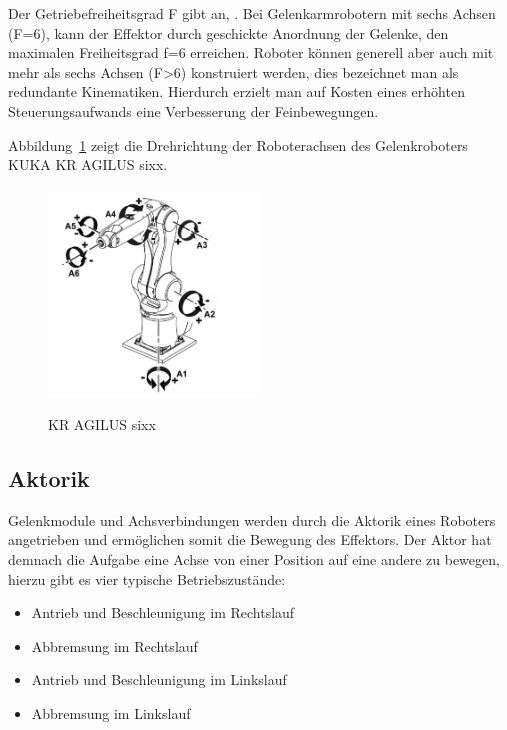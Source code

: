 \documentclass[11pt,ngerman,parskip=half]{scrartcl}
\begin{document}
Der Getriebefreiheitsgrad F gibt an,
. Bei Gelenkarmrobotern mit sechs Achsen (F=6), kann der
Effektor durch geschickte Anordnung der Gelenke, den maximalen Freiheitsgrad
f=6 erreichen. Roboter können generell aber auch mit mehr als sechs Achsen
(F>6) konstruiert werden, dies bezeichnet man als redundante Kinematiken.
Hierdurch erzielt man auf Kosten eines erhöhten Steuerungsaufwands eine
Verbesserung der Feinbewegungen.
\parencite[vgl.][18]{weber_industrieroboter:_2017}

Abbildung~\ref{img:KR-AGILUS-sixx} zeigt die Drehrichtung der Roboterachsen des
Gelenkroboters KUKA KR AGILUS sixx.
\begin{figure}[H]
  \centering
  \includegraphics[width=0.5\textwidth]{src/img/KR-AGILUS-sixx.png}
  \caption{KR AGILUS sixx}
  \label{img:KR-AGILUS-sixx}
  \parencite{kuka_gmbh_kr_2018}
\end{figure}

\subsection{Aktorik}
\label{subsec:Aktorik}
Gelenkmodule und Achsverbindungen werden durch die Aktorik eines Roboters
angetrieben und ermöglichen somit die Bewegung des Effektors. Der Aktor hat
demnach die Aufgabe eine Achse von einer Position auf eine andere zu bewegen,
hierzu gibt es vier typische Betriebszustände:
\begin{itemize}
  \item Antrieb und Beschleunigung im Rechtslauf
  \item Abbremsung im Rechtslauf
  \item Antrieb und Beschleunigung im Linkslauf
  \item Abbremsung im Linkslauf
\end{itemize}
\end{document}
